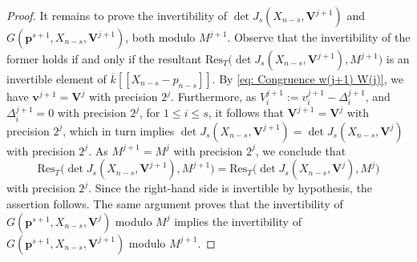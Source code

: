 \documentclass[10pt,a4paper]{amsart}
\newcommand{\bfs}{\boldsymbol}
\begin{document}
\begin{proof}
It remains to prove the invertibility of $\det J_s( X_{n-s}, \bfs
V^{j+1})$ and $G(\bfs p^{s+1}, X_{n-s}, \bfs V^{j+1})$, both modulo
$M^{j+1}$. Observe that the invertibility of the former holds if and
only if the resultant $\mathrm{Res}_T\big(\det J_s( X_{n-s}, \bfs
V^{j+1}),M^{j+1}\big)$ is an invertible element of
$\overline{k}[\![X_{n-s} -p_{n-s}]\!]$. By \eqref{eq: Congruence
w(j+1) W(j)}, we have $\bfs v^{j+1}=\bfs V^j$ with precision $2^j$.
Furthermore, as $V_i^{j+1}:=v_i^{j+1}- \Delta_i^{j+1}$, and
$\Delta_i^{j+1}=0$ with precision $2^j$, for $1\le i\le s$, it
follows that $\bfs V^{j+1}=\bfs V^j$ with precision $2^j$, which in
turn implies $\det J_s( X_{n-s}, \bfs V^{j+1})=\det J_s(X_{n-s},
\bfs V^j)$ with precision $2^j$. As $M^{j+1}=M^j$ with precision
$2^j$, we conclude that
%
$$\mathrm{Res}_T\big(\det J_s(X_{n-s}, \bfs
V^{j+1}),M^{j+1}\big)=\mathrm{Res}_T\big(\det J_s(
X_{n-s}, \bfs V^j),M^j\big)$$
%
with precision $2^j$. Since the right-hand side is invertible by
hypothesis, the assertion follows. The same argument proves that the
invertibility of $G(\bfs p^{s+1}, X_{n-s}, \bfs V^j)$ modulo $M^j$
implies the invertibility of $G(\bfs p^{s+1}, X_{n-s}, \bfs V^{j+1})$
modulo $M^{j+1}$.
\end{proof}
\end{document}
